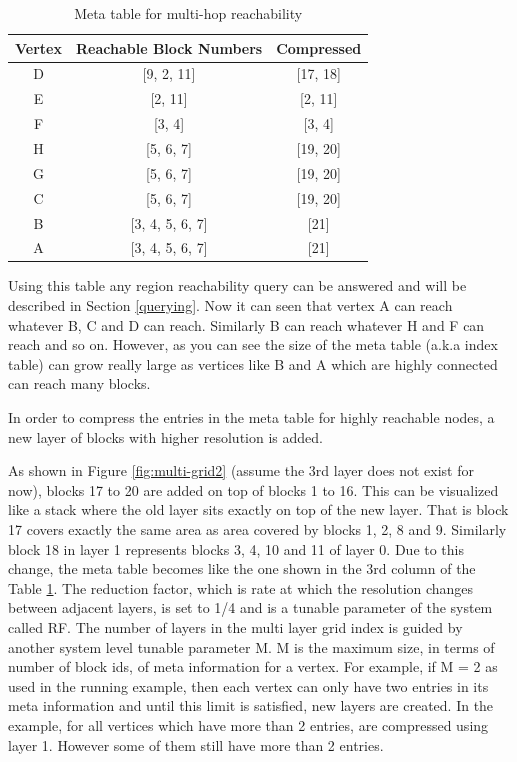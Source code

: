 \begin{table}[h]
	\caption{Meta table for multi-hop reachability}
	\label{tab:multi-hop-meta}
	\begin{center}
		\renewcommand{\arraystretch}{1.25}
		\begin{tabular}{ c | c | c }
			\hline
			Vertex & Reachable Block Numbers & Compressed\\ \hline
			\hline
			D & [9, 2, 11] & [17, 18] \\
			E & [2, 11] & [2, 11] \\
			F & [3, 4] & [3, 4] \\
			H & [5, 6, 7] & [19, 20] \\
			G & [5, 6, 7] & [19, 20] \\
			C & [5, 6, 7] & [19, 20] \\
			B & [3, 4, 5, 6, 7] & [21] \\
			A & [3, 4, 5, 6, 7] & [21] \\
			\hline
		\end{tabular}
	\end{center}
\end{table}

Using this table any region reachability query can be answered and will be described in Section \ref{querying}. Now it can seen that vertex A can reach whatever B, C and D can reach. Similarly B can reach whatever H and F can reach and so on. However, as you can see the size of the meta table (a.k.a index table) can grow really large as vertices like B and A which are highly connected can reach many blocks.

In order to compress the entries in the meta table for highly reachable nodes, a new layer of blocks with higher resolution is added.


As shown in Figure \ref{fig:multi-grid2} (assume the 3rd layer does not exist for now), blocks 17 to 20 are added on top of blocks 1 to 16. This can be visualized like a stack where the old layer sits exactly on top of the new layer. That is block 17 covers exactly the same area as area covered by blocks 1, 2, 8 and 9. Similarly block 18 in layer 1 represents blocks 3, 4, 10 and 11 of layer 0. Due to this change, the meta table becomes like the one shown in the 3rd column of the Table \ref{tab:multi-hop-meta}. The reduction factor, which is rate at which the resolution changes between adjacent layers, is set to 1/4 and is a tunable parameter of the system called RF. The number of layers in the multi layer grid index is guided by another system level tunable parameter M. M is the maximum size, in terms of number of block ids, of meta information for a vertex. For example, if M = 2 as used in the running example, then each vertex can only have two entries in its meta information and until this limit is satisfied, new layers are created. In the example, for all vertices which have more than 2 entries, are compressed using layer 1. However some of them still have more than 2 entries. 


